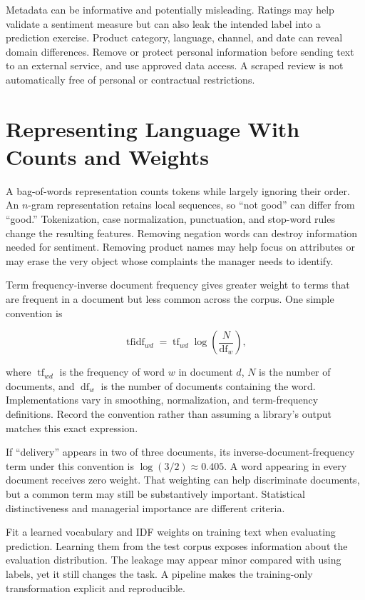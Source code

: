 Metadata can be informative and potentially misleading. Ratings may help
validate a sentiment measure but can also leak the intended label into a
prediction exercise. Product category, language, channel, and date can
reveal domain differences. Remove or protect personal information before
sending text to an external service, and use approved data access. A
scraped review is not automatically free of personal or contractual
restrictions.

\hypertarget{M05-representing-language-with-counts-and-weights}{%
\section{Representing Language With Counts and
Weights}\label{M05-representing-language-with-counts-and-weights}}

\noindent A bag-of-words representation counts tokens while largely ignoring their
order. An \(n\)-gram representation retains local sequences, so ``not
good'' can differ from ``good.'' Tokenization, case normalization,
punctuation, and stop-word rules change the resulting features. Removing
negation words can destroy information needed for sentiment. Removing
product names may help focus on attributes or may erase the very object
whose complaints the manager needs to identify.

Term frequency-inverse document frequency gives greater weight to terms
that are frequent in a document but less common across the corpus. One
simple convention is

\[
\operatorname{tfidf}_{wd}=\operatorname{tf}_{wd}\log\left(\frac{N}{\operatorname{df}_w}\right),
\]

where \(\operatorname{tf}_{wd}\) is the frequency of word \(w\) in
document \(d\), \(N\) is the number of documents, and
\(\operatorname{df}_w\) is the number of documents containing the word.
Implementations vary in smoothing, normalization, and term-frequency
definitions. Record the convention rather than assuming a library's
output matches this exact expression.

If ``delivery'' appears in two of three documents, its
inverse-document-frequency term under this convention is
\(\log(3/2)\approx0.405\). A word appearing in every document receives
zero weight. That weighting can help discriminate documents, but a
common term may still be substantively important. Statistical
distinctiveness and managerial importance are different criteria.

Fit a learned vocabulary and IDF weights on training text when
evaluating prediction. Learning them from the test corpus exposes
information about the evaluation distribution. The leakage may appear
minor compared with using labels, yet it still changes the task. A
pipeline makes the training-only transformation explicit and
reproducible.

